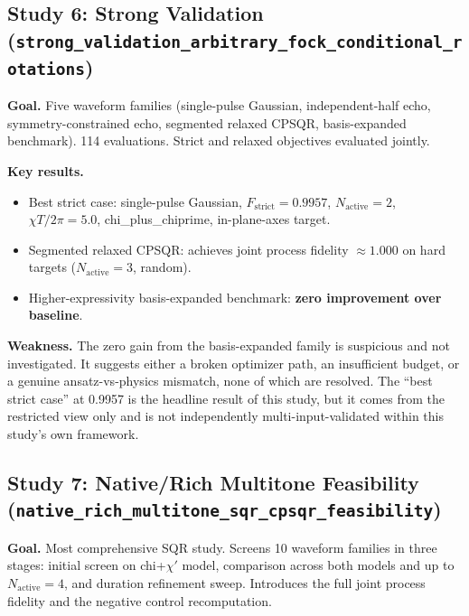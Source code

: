 \documentclass[11pt,letterpaper]{article}
\newcommand{\chiT}{\chi T / 2\pi}
\newcommand{\nact}{N_{\text{active}}}
\begin{document}
\subsection{Study 6: Strong Validation (\texttt{strong\_validation\_arbitrary\_fock\_conditional\_rotations})}

\textbf{Goal.}  Five waveform families (single-pulse Gaussian, independent-half echo,
symmetry-constrained echo, segmented relaxed CPSQR, basis-expanded benchmark).
114 evaluations. Strict and relaxed objectives evaluated jointly.

\textbf{Key results.}
\begin{itemize}
\item Best strict case: single-pulse Gaussian, $F_\text{strict} = 0.9957$,
  $\nact = 2$, $\chiT = 5.0$, chi\_plus\_chiprime, in-plane-axes target.
\item Segmented relaxed CPSQR: achieves joint process fidelity $\approx 1.000$
  on hard targets ($\nact = 3$, random).
\item Higher-expressivity basis-expanded benchmark: \textbf{zero improvement over baseline}.
\end{itemize}

\textbf{Weakness.}  The zero gain from the basis-expanded family is suspicious
and not investigated.  It suggests either a broken optimizer path, an
insufficient budget, or a genuine ansatz-vs-physics mismatch, none of which
are resolved.  The ``best strict case'' at 0.9957 is the headline result of this study,
but it comes from the restricted view only and is not independently multi-input-validated
within this study's own framework.

\subsection{Study 7: Native/Rich Multitone Feasibility (\texttt{native\_rich\_multitone\_sqr\_cpsqr\_feasibility})}

\textbf{Goal.}  Most comprehensive SQR study.  Screens 10 waveform families in three stages:
initial screen on chi+$\chi'$ model, comparison across both models and up to $\nact = 4$,
and duration refinement sweep.  Introduces the full joint process fidelity
and the negative control recomputation.
\end{document}
